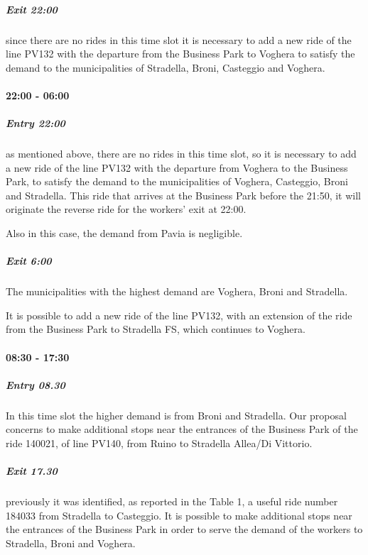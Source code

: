 \subparagraph{Exit 22:00} since there are no rides in this time slot it is necessary to add a new ride of the line PV132 with the departure from the Business Park to Voghera to satisfy the demand to the municipalities of Stradella, Broni, Casteggio and Voghera.

\paragraph{22:00 - 06:00}

\subparagraph{Entry 22:00} as mentioned above, there are no rides in this time slot, so it is necessary to add a new ride of the line PV132 with the departure from Voghera to the Business Park, to satisfy the demand to the municipalities of Voghera, Casteggio, Broni and Stradella. This ride that arrives at the Business Park before the 21:50, it will originate the reverse ride for the workers’ exit at 22:00.

Also in this case, the demand from Pavia is negligible.

\subparagraph{Exit 6:00} The municipalities with the highest demand are Voghera, Broni and Stradella. 

It is possible to add a new ride of the line PV132, with an extension of the ride from the Business Park to Stradella FS, which continues to Voghera.

\paragraph{08:30 - 17:30}

\subparagraph{Entry 08.30}In this time slot the higher demand is from Broni and Stradella. Our proposal concerns to make additional stops near the entrances of the Business Park of the ride 140021, of line PV140, from Ruino to Stradella Allea/Di Vittorio.

\subparagraph{Exit 17.30}previously it was identified, as reported in the Table 1, a useful ride number 184033 from Stradella to Casteggio. It is possible to make additional stops near the entrances of the Business Park in order to serve the demand of the workers to Stradella, Broni and Voghera.




